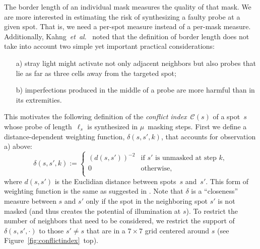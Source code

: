 \documentclass{llncs}
\begin{document}
The border length of an individual mask measures the quality of that
mask. We are more interested in estimating the risk of synthesizing a faulty
probe at a given spot. That is, we need a per-spot measure
instead of a per-mask measure. Additionally, Kahng~{\it et~al}.~\cite{KAHNG03A} noted
that the definition of border length does not take into account two
simple yet important practical considerations:
\begin{itemize}
\item[a)] stray light might activate not only adjacent neighbors but
  also probes that lie as far as three cells away from the targeted
  spot;
\item[b)] imperfections produced in the middle of a probe are more
  harmful than in its extremities.
\end{itemize}
This motivates the following definition of the \emph{conflict
  index}~$\mathcal{C}(s)$ of a spot~$s$ whose probe of
length~$\ell_{s}$ is synthesized in $\mu$~masking steps. First we
define a distance-dependent weighting function, $\delta(s,s',k)$, that
accounts for observation a) above:
\begin{equation}
\label{eq:dist_weight}
\delta(s,s',k) :=
        \left\{
                \begin{array}{ll}
                        (d(s,s'))^{-2} & \mbox{if $s'$ is unmasked at step $k$}, \\
                        0 & \mbox{otherwise}, \\
                \end{array}
        \right.
\end{equation}
where $d(s,s')$ is the Euclidian distance between spots~$s$ and~$s'$.
This form of weighting function is the same as suggested in
\cite{KAHNG03A}.  Note that $\delta$ is a ``closeness'' measure
between $s$ and $s'$ only if the spot in the neighboring spot $s'$ is
not masked (and thus creates the potential of illumination at $s$). To
restrict the number of neighbors that need to be considered, we
restrict the support of $\delta(s,s',\cdot)$ to those $s'\neq s$ that
are in a $7\times 7$ grid centered around $s$ (see
Figure~\ref{fig:conflictindex}~top).
\end{document}
